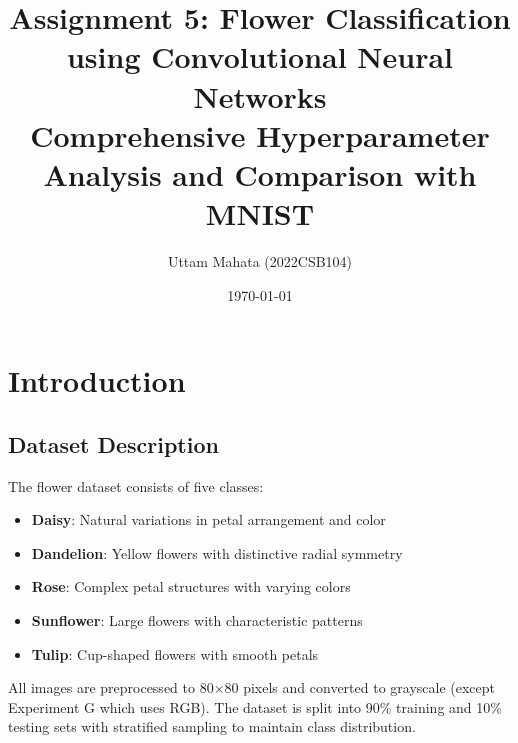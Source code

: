 \documentclass[12pt,a4paper]{article}
\title{\textbf{Assignment 5: Flower Classification using Convolutional Neural Networks}\\
\large Comprehensive Hyperparameter Analysis and Comparison with MNIST}
\author{Uttam Mahata (2022CSB104) }
\date{\today}
\begin{document}
\maketitle


\newpage

\section{Introduction}



\subsection{Dataset Description}
The flower dataset consists of five classes:
\begin{itemize}
    \item \textbf{Daisy}: Natural variations in petal arrangement and color
    \item \textbf{Dandelion}: Yellow flowers with distinctive radial symmetry
    \item \textbf{Rose}: Complex petal structures with varying colors
    \item \textbf{Sunflower}: Large flowers with characteristic patterns
    \item \textbf{Tulip}: Cup-shaped flowers with smooth petals
\end{itemize}

All images are preprocessed to 80×80 pixels and converted to grayscale (except Experiment G which uses RGB). The dataset is split into 90\% training and 10\% testing sets with stratified sampling to maintain class distribution.
\end{document}
